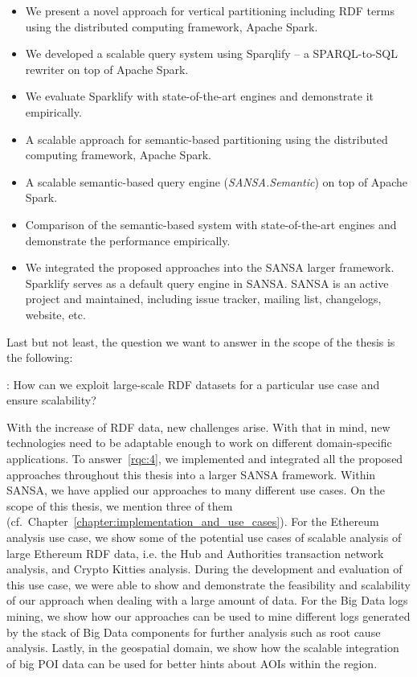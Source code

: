 \begin{itemize}
 \item We present a novel approach for vertical partitioning including \gls{RDF} terms using the distributed computing framework, Apache Spark.
 \item We developed a scalable query system using Sparqlify -- a SPARQL-to-SQL rewriter on top of Apache Spark.
 \item We evaluate Sparklify with state-of-the-art engines and demonstrate it empirically.
 \item A scalable approach for semantic-based partitioning using the distributed computing framework, Apache Spark.
 \item A scalable semantic-based query engine (\textit{SANSA.Semantic}) on top of Apache Spark.
 \item Comparison of the semantic-based system with state-of-the-art engines and demonstrate the performance empirically.
 \item We integrated the proposed approaches into the SANSA larger framework.
 Sparklify serves as a default query engine in SANSA.
 SANSA is an active project and maintained, including issue tracker, mailing list, changelogs, website, etc.
\end{itemize}

Last but not least, the question we want to answer in the scope of the thesis is the following:

\begin{tcolorbox}
\textbf{\rqNr[RQ4]\label{rqc:4}}: How can we exploit large-scale \gls{RDF} datasets for a particular use case and ensure scalability?
\end{tcolorbox}

With the increase of \gls{RDF} data, new challenges arise.
With that in mind, new technologies need to be adaptable enough to work on different domain-specific applications.
To answer~\ref{rqc:4}, we implemented and integrated all the proposed approaches throughout this thesis into a larger SANSA framework.
Within SANSA, we have applied our approaches to many different use cases.
On the scope of this thesis, we mention three of them (cf.\ Chapter~\ref{chapter:implementation_and_use_cases}).
For the Ethereum analysis use case, we show some of the potential use cases of scalable analysis of large Ethereum \gls{RDF} data, i.e. the Hub and Authorities transaction network analysis, and Crypto Kitties analysis.
During the development and evaluation of this use case, we were able to show and demonstrate the feasibility and scalability of our approach when dealing with a large amount of data.
For the Big Data logs mining, we show how our approaches can be used to mine different logs generated by the stack of Big Data components for further analysis such as root cause analysis.
Lastly, in the geospatial domain, we show how the scalable integration of big \gls{POI} data can be used for better hints about \gls{AOI}s within the region.



